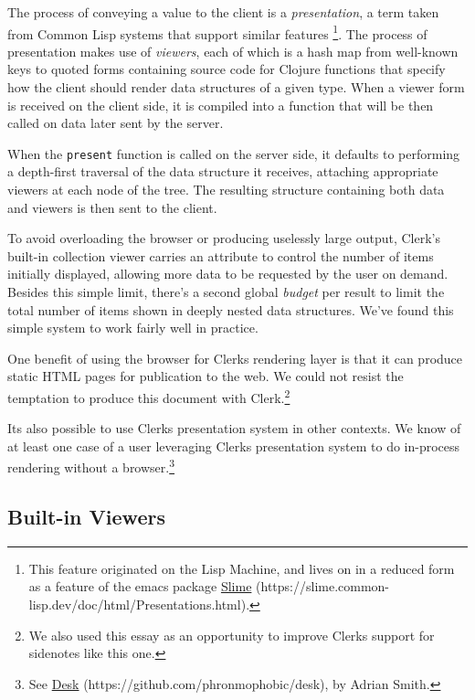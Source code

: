 \documentclass[sigconf,screen]{acmart}
\newcommand{\passthrough}[1]{#1}
\begin{document}
The process of conveying a value to the client is a \emph{presentation}, a
term taken from Common Lisp systems that support similar features \footnote{This feature originated on the Lisp Machine, and lives on in a reduced form as a feature of the emacs package {\href{https://slime.common-lisp.dev/doc/html/Presentations.html}{Slime} (https://slime.common-lisp.dev/doc/html/Presentations.html)}.}. The process of presentation makes use of \emph{viewers}, each of which is a hash map from well-known keys to quoted forms containing source code for Clojure functions that specify how the client should render data structures of a given type. When a viewer form is received on the client side, it is compiled into a function that will be then called on data later sent by the server.

When the \passthrough{\lstinline!present!} function is called on the server side, it defaults to performing a depth-first traversal of the data structure it receives, attaching appropriate viewers at each node of the tree. The resulting structure containing both data and viewers is then sent to the client.

To avoid overloading the browser or producing uselessly large output, Clerk's built-in collection viewer carries an attribute to control the number of items initially displayed, allowing more data to be requested by the user on demand. Besides this simple limit, there's a second global \emph{budget} per result to limit the total number of items shown in deeply nested data structures. We've found this simple system to work fairly well in practice.

One benefit of using the browser for Clerk\textquotesingle s rendering layer is that it can produce static HTML pages for publication to the web. We could not resist the temptation to produce this document with Clerk.\footnote{We also used this essay as an opportunity to improve Clerk\textquotesingle s support for sidenotes like this one.}

It\textquotesingle s also possible to use Clerk\textquotesingle s presentation system in other contexts. We know of at least one case of a user leveraging Clerk\textquotesingle s presentation system to do in-process rendering without a browser.\footnote{See {\href{https://github.com/phronmophobic/desk}{Desk} (https://github.com/phronmophobic/desk)}, by Adrian Smith.}

\hypertarget{built-in-viewers}{%
\subsection{Built-in Viewers}\label{built-in-viewers}}
\end{document}
